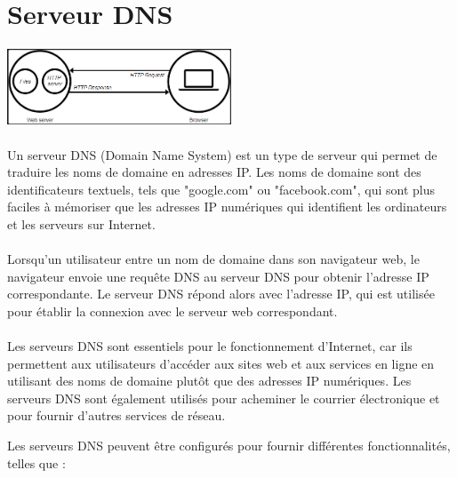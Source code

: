  \section{Serveur DNS}
\vspace{4mm}
\paragraph{
	\includegraphics[width=0.5\textwidth]{Server_web.png}}
\paragraph{ }
Un serveur DNS (Domain Name System) est un type de serveur qui permet de traduire les noms de domaine en adresses IP. Les noms de domaine sont des identificateurs textuels, tels que "google.com" ou "facebook.com", qui sont plus faciles à mémoriser que les adresses IP numériques qui identifient les ordinateurs et les serveurs sur Internet.
\paragraph{ }
Lorsqu'un utilisateur entre un nom de domaine dans son navigateur web, le navigateur envoie une requête DNS au serveur DNS pour obtenir l'adresse IP correspondante. Le serveur DNS répond alors avec l'adresse IP, qui est utilisée pour établir la connexion avec le serveur web correspondant.
\paragraph{ }
Les serveurs DNS sont essentiels pour le fonctionnement d'Internet, car ils permettent aux utilisateurs d'accéder aux sites web et aux services en ligne en utilisant des noms de domaine plutôt que des adresses IP numériques. Les serveurs DNS sont également utilisés pour acheminer le courrier électronique et pour fournir d'autres services de réseau.

Les serveurs DNS peuvent être configurés pour fournir différentes fonctionnalités, telles que :

